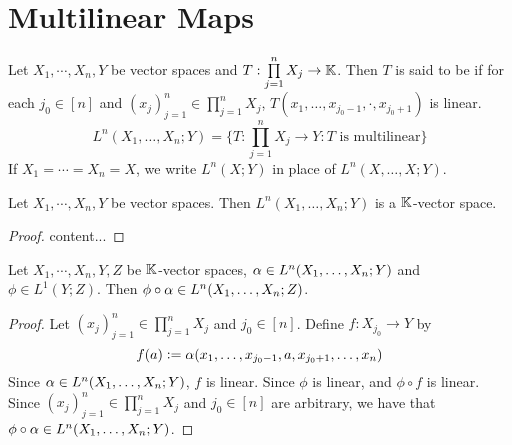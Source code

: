 \documentclass{book}
\begin{document}
 
 
 
 
 
 
 
 
 
 
 
 
 
 
 
 
 
 
 
 
 \newpage
 \section{Multilinear Maps}
 
 \begin{defn}
 	Let $X_1, \cdots, X_n, Y$ be vector spaces and $T: \prod\limits_{j=1}^n X_j \rightarrow \mathbb{K}$. Then $T$ is said to be  if for each $j_0 \in [n]$ and $(x_j)_{j=1}^n \in \prod\limits_{j=1}^n X_j$, $T(x_1, \ldots, x_{j_0 - 1}, \cdot, x_{j_0 + 1})$ is linear. $$L^n(X_1, \dots, X_n; Y) = \bigg\{T : \prod\limits_{j=1}^n X_j \rightarrow Y: T \text{ is multilinear}\bigg \}$$ 
 	If $X_1 = \cdots = X_n = X$, we write $L^n(X;Y)$ in place of $L^n (X, \dots, X; Y) $. 
 \end{defn}
 
 \begin{defn}
 \end{defn}
 
 \begin{ex}
 	Let $X_1, \cdots, X_n, Y$ be vector spaces. Then $L^n(X_1, \ldots, X_n;Y)$ is a $\mathbb{K}$-vector space.
 \end{ex}
 
 \begin{proof}
 	content...
 \end{proof}
 
 \begin{ex}
 	Let $X_1, \cdots, X_n, Y, Z$ be $\mathbb{K}$-vector spaces, $\alpha \in L^n(X_1, \ldots, X_n;Y)$ and $\phi \in L^1(Y;Z)$. Then $\phi \circ \alpha \in L^n(X_1, \ldots, X_n; Z)$. 
 \end{ex}
 
 \begin{proof}
 	Let $(x_j)_{j=1}^n \in \prod\limits_{j=1}^n X_j$ and $j_0 \in [n]$. Define $f:X_{j_0} \rightarrow Y$ by 
 	$$f(a) \vcentcolon= \alpha(x_1, \ldots, x_{j_0-1}, a , x_{j_0+1}, \ldots, x_n) $$
 	Since $\alpha \in L^n(X_1, \ldots, X_n;Y)$, $f$ is linear. Since $\phi$ is linear, and $\phi \circ f$ is linear. Since $(x_j)_{j=1}^n \in \prod\limits_{j=1}^n X_j$ and $j_0 \in [n]$ are arbitrary, we have that $\phi \circ \alpha \in L^n(X_1, \ldots, X_n;Y)$. 
 \end{proof}
 
\end{document}
